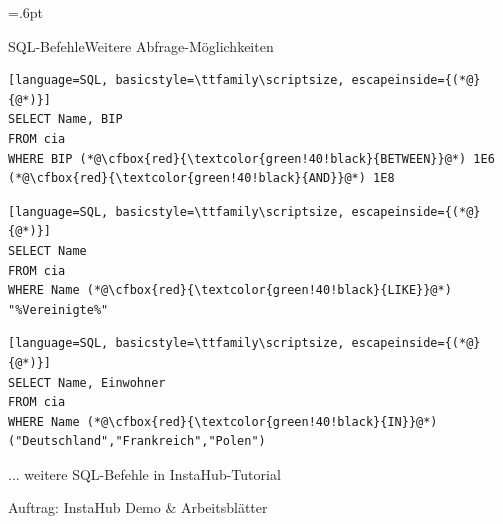 \fboxsep=.6pt
\newcommand{\cfbox}[2]{%
    \colorlet{currentcolor}{.}%
    {\color{#1}%
    \fbox{\color{currentcolor}#2}}%
}
\begin{frame}[fragile]{SQL-Befehle}{Weitere Abfrage-Möglichkeiten}
\begin{lstlisting}[language=SQL, basicstyle=\ttfamily\scriptsize, escapeinside={(*@}{@*)}]
SELECT Name, BIP
FROM cia
WHERE BIP (*@\cfbox{red}{\textcolor{green!40!black}{BETWEEN}}@*) 1E6 (*@\cfbox{red}{\textcolor{green!40!black}{AND}}@*) 1E8
\end{lstlisting}
\begin{lstlisting}[language=SQL, basicstyle=\ttfamily\scriptsize, escapeinside={(*@}{@*)}]
SELECT Name
FROM cia
WHERE Name (*@\cfbox{red}{\textcolor{green!40!black}{LIKE}}@*) "%Vereinigte%"
\end{lstlisting}

\begin{lstlisting}[language=SQL, basicstyle=\ttfamily\scriptsize, escapeinside={(*@}{@*)}]
SELECT Name, Einwohner
FROM cia
WHERE Name (*@\cfbox{red}{\textcolor{green!40!black}{IN}}@*) ("Deutschland","Frankreich","Polen")
\end{lstlisting}
... weitere SQL-Befehle in InstaHub-Tutorial
\end{frame}

\begin{frame}{Auftrag: InstaHub }
\centering
Demo \& Arbeitsblätter
\end{frame}